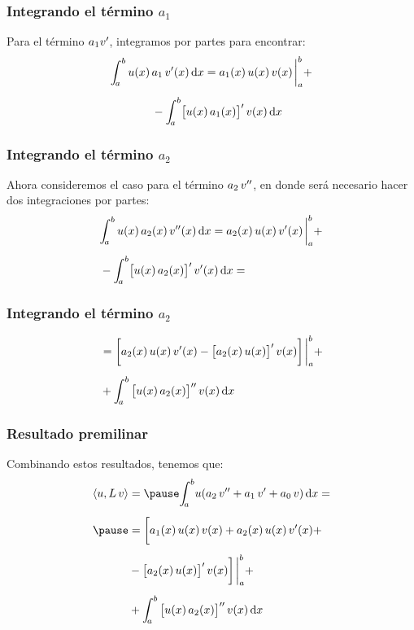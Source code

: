 \documentclass[12pt]{beamer}
\begin{document}
\begin{frame}
\frametitle{Integrando el término $a_{1}$}
Para el término $a_{1} {v}^{\prime}$, integramos por partes para encontrar:
\pause
\begin{eqnarray}
\begin{aligned}[b]
\scaleint{5ex}_{\bs a}^{b} \, u(x) \, &a_{1} \, \pderivada{v}(x) \dd{x} = a_{1}(x) \, u(x) \, v(x) \eval_{a}^{b} + \\[0.5em]
&- \scaleint{5ex}_{\bs a}^{b} \big[ u(x) \, a_{1} (x) \big]^{\prime} \, v(x) \dd{x}
\end{aligned}
\label{eq:ecuacion_04_17}
\end{eqnarray}
\end{frame}
\begin{frame}
\frametitle{Integrando el término $a_{2}$}
Ahora consideremos el caso para el término $a_{2} \, {v}^{\prime \prime}$, en donde será necesario hacer dos integraciones por partes:
\pause
\begin{eqnarray*}
\begin{aligned}[b]
&\scaleint{5ex}_{\bs a}^{b} \, u(x) \, a_{2} (x) \, \sderivada{v}(x) \dd{x} = a_{2}(x) \, u(x) \, \pderivada{v}(x) \eval_{a}^{b} + \\[0.5em]
&- \scaleint{5ex}_{\bs a}^{b} \big[ u(x) \, a_{2} (x) \big]^{\prime} \, \pderivada{v}(x) \dd{x} = \end{aligned}
\end{eqnarray*}
\end{frame}
\begin{frame}
\frametitle{Integrando el término $a_{2}$}
\begin{eqnarray}
\begin{aligned}[b]
&= \bigg[ a_{2}(x) \, u(x) \, \pderivada{v}(x) - \big[ a_{2}(x) \, u(x) \big]^{\prime} \, v(x) \bigg] \eval_{a}^{b} + \\[0.5em]
&+ \scaleint{5ex}_{\bs a}^{b} \, \big[ u(x) \, a_{2} (x) \big]^{\prime \prime} \, v(x) \dd{x}
\end{aligned}
\label{eq:ecuacion_04_18}
\end{eqnarray}
\end{frame}    
\begin{frame}
\frametitle{Resultado premilinar}
Combinando estos resultados, tenemos que:
\pause
\begin{eqnarray}
\begin{aligned}[b]
\langle u , L \, v \rangle &= \pause \scaleint{5ex}_{\bs a}^{b} u (a_{2} \, \sderivada{v} + a_{1} \, \pderivada{v} + a_{0} \, v) \dd{x} = \\[0.5em] \pause
&= \bigg[ a_{1}(x) \, u(x) \, v(x) + a_{2}(x) \, u(x) \, \pderivada{v}(x) + \\[0.5em]
&- \big[ a_{2}(x) \, u(x) \big]^{\prime} \, v(x) \bigg] \eval_{a}^{b} + \\[0.5em]
&+ \scaleint{5ex}_{\bs a}^{b} \, \big[ u(x) \, a_{2} (x) \big]^{\prime \prime} \, v(x) \dd{x}
\end{aligned}
\label{eq:ecuacion_04_19}
\end{eqnarray}
\end{frame}
\end{document}
